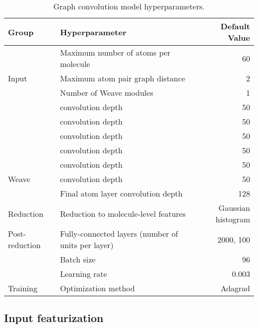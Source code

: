 \begin{table*}[htbp]
  \caption{Graph convolution model hyperparameters.}
  \label{table:hyperparameters}
  \centering
  \begin{tabular}{ l l r }
  \toprule
  Group & Hyperparameter & Default Value \\
  \midrule
  \cellcolor{white} & Maximum number of atoms per molecule & 60 \\
  \multirow{-2}{*}{\cellcolor{white}Input} &
      Maximum atom pair graph distance & 2 \\
  \midrule
  \cellcolor{white} & Number of Weave modules & 1 \\
  \cellcolor{white} &  convolution depth & 50 \\
  \cellcolor{white} &  convolution depth & 50 \\
  \cellcolor{white} &  convolution depth & 50 \\
  \cellcolor{white} &  convolution depth & 50 \\
  \cellcolor{white} &  convolution depth & 50 \\
  \multirow{-7}{*}{\cellcolor{white}Weave} &  convolution depth & 50 \\
  \midrule
  \cellcolor{white} & Final atom layer convolution depth & 128 \\
  \multirow{-2}{*}{\cellcolor{white}Reduction} &
      Reduction to molecule-level features & Gaussian histogram \\
  \midrule
  \cellcolor{white}Post-reduction &
      Fully-connected layers (number of units per layer) & 2000, 100 \\
  \midrule
  \cellcolor{white} & Batch size & 96 \\
  \cellcolor{white} & Learning rate & 0.003 \\
  \multirow{-3}{*}{\cellcolor{white}Training} & Optimization method & Adagrad \\
  \bottomrule
  \end{tabular}
\end{table*}

\subsection{Input featurization}\label{sec:input_features}

